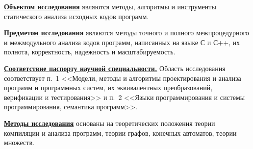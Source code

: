 {\underline{\textbf{Объектом исследования}} являются методы, алгоритмы и инструменты статического анализа исходных кодов программ.

\underline{\textbf{Предметом исследования}} являются методы точного и полного межпроцедурного и межмодульного анализа кодов программ, написанных на языке С и С++, их полнота, корректность, надежность и масштабируемость.

\underline{\textbf{Соответствие паспорту научной специальности.}} Область исследования соответствует п.~1 <<Модели, методы и алгоритмы проектирования и анализа программ и программных систем, их эквивалентных преобразований, верификации и тестирования>> и п.~2 <<Языки программирования и системы программирования, семантика программ>>.

\underline{\textbf{Методы исследования}} основаны на теоретических положения теории компиляции и анализа программ, теории графов, конечных автоматов, теории множеств.

\novelty

}
